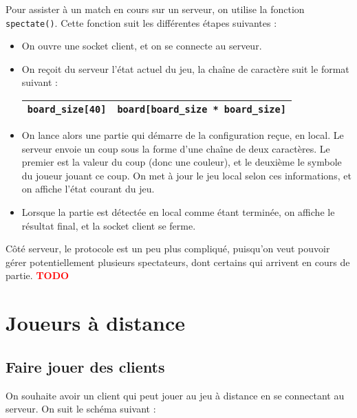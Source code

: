 \documentclass[a4paper]{article}
\newcommand{\TODO}{\textcolor{red}{\textbf{TODO}}}
\begin{document}
Pour assister à un match en cours sur un serveur, on utilise la fonction \texttt{spectate()}. Cette fonction suit les différentes étapes suivantes :

%
\begin{itemize}
	\setlength\itemsep{1em}
	\item On ouvre une socket client, et on se connecte au serveur.
	\item On reçoit du serveur l'état actuel du jeu, la chaîne de caractère suit le format suivant :

		\bgroup
		\def\arraystretch{1.5}
		\begin{center}
		\begin{tabular}{|c|c|}
			\hline 
			\texttt{board\_size[40]} & \texttt{board[board\_size * board\_size]} \\ 
			\hline 
		\end{tabular} 	
		\end{center}
		\egroup
	
	\item On lance alors une partie qui démarre de la configuration reçue, en local. Le serveur envoie un coup sous la forme d'une chaîne de deux caractères. Le premier est la valeur du coup (donc une couleur), et le deuxième le symbole du joueur jouant ce coup. On met à jour le jeu local selon ces informations, et on affiche l'état courant du jeu. 
	\item Lorsque la partie est détectée en local comme étant terminée, on affiche le résultat final, et la socket client se ferme. \\

\end{itemize}
%


Côté serveur, le protocole est un peu plus compliqué, puisqu'on veut pouvoir gérer potentiellement plusieurs spectateurs, dont certains qui arrivent en cours de partie.
\TODO


\section{Joueurs à distance}

\subsection{Faire jouer des clients}

On souhaite avoir un client qui peut jouer au jeu à distance en se connectant au serveur. On suit le schéma suivant :
\end{document}
